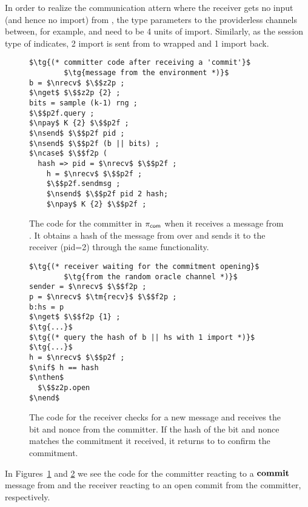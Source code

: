In order to realize the communication attern where the receiver gets no input (and hence no import) from \Z, the type parameters to the providerless channels between, for example, \Z and \partywrapper need to be 4 units of import.  Similarly, as the session type of \Fropp indicates, 2 import is sent from \partywrapper to wrapped \Fropp and 1 import back. 

\begin{figure}
\begin{lstlisting}[basicstyle=\footnotesize\BeraMonottFamily, frame=single, mathescape]
$\tg{(* committer code after receiving a 'commit'}$
        $\tg{message from the environment *)}$
b = $\nrecv$ $\$$z2p ;
$\nget$ $\$$z2p {2} ;
bits = sample (k-1) rng ;
$\$$p2f.query ;
$\npay$ K {2} $\$$p2f ;
$\nsend$ $\$$p2f pid ;
$\nsend$ $\$$p2f (b || bits) ;
$\ncase$ $\$$f2p (
  hash => pid = $\nrecv$ $\$$p2f ; 
    h = $\nrecv$ $\$$p2f ;
    $\$$p2f.sendmsg ;
    $\nsend$ $\$$p2f pid 2 hash;
	$\npay$ K {2} $\$$p2f ;
\end{lstlisting}
\caption{The code for the committer in $\pi_{{\mathsf {com}}}$ when it receives a  message from \Z. It obtains a hash of the message from \Fropp over  and sends it to the receiver (pid=2) through the same functionality.}
\label{lst:committer}
\vspace{-2mm}
\end{figure}

\begin{figure}
\begin{lstlisting}[basicstyle=\footnotesize\BeraMonottFamily, frame=single, mathescape]
$\tg{(* receiver waiting for the commitment opening}$
        $\tg{from the random oracle channel *)}$
sender = $\nrecv$ $\$$f2p ;
p = $\nrecv$ $\tm{recv}$ $\$$f2p ;
b:hs = p
$\nget$ $\$$f2p {1} ; 
$\tg{...}$
$\tg{(* query the hash of b || hs with 1 import *)}$
$\tg{...}$
h = $\nrecv$ $\$$p2f ;
$\nif$ h == hash
$\nthen$
  $\$$z2p.open
$\nend$
\end{lstlisting}
\caption{The code for the receiver checks for a new message and receives the bit and nonce from the committer. If the hash of the bit and nonce matches the commitment it received, it returns  to \Z to confirm the commitment.}
\label{lst:receiver}
\vspace{-3mm}
\end{figure}

In Figures~\ref{lst:committer} and \ref{lst:receiver} we see the code for the committer reacting to a $\mathbf{commit}$ message from \Z and the receiver reacting to an open commit from the committer, respectively. 

